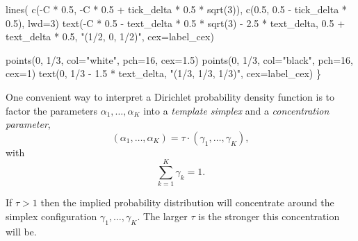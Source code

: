 \documentclass[
  letterpaper,
  DIV=11,
  numbers=noendperiod]{scrartcl}
\newenvironment{Shaded}{\begin{snugshade}}{\end{snugshade}}
\newcommand{\AttributeTok}[1]{\textcolor[rgb]{0.40,0.45,0.13}{#1}}
\newcommand{\DecValTok}[1]{\textcolor[rgb]{0.68,0.00,0.00}{#1}}
\newcommand{\FloatTok}[1]{\textcolor[rgb]{0.68,0.00,0.00}{#1}}
\newcommand{\FunctionTok}[1]{\textcolor[rgb]{0.28,0.35,0.67}{#1}}
\newcommand{\NormalTok}[1]{\textcolor[rgb]{0.00,0.23,0.31}{#1}}
\newcommand{\SpecialCharTok}[1]{\textcolor[rgb]{0.37,0.37,0.37}{#1}}
\newcommand{\StringTok}[1]{\textcolor[rgb]{0.13,0.47,0.30}{#1}}
\begin{document}
\begin{Shaded}
\begin{Highlighting}[]
  \FunctionTok{lines}\NormalTok{( }\FunctionTok{c}\NormalTok{(}\SpecialCharTok{{-}}\NormalTok{C }\SpecialCharTok{*} \FloatTok{0.5}\NormalTok{, }\SpecialCharTok{{-}}\NormalTok{C }\SpecialCharTok{*} \FloatTok{0.5} \SpecialCharTok{+}\NormalTok{ tick\_delta }\SpecialCharTok{*} \FloatTok{0.5} \SpecialCharTok{*} \FunctionTok{sqrt}\NormalTok{(}\DecValTok{3}\NormalTok{)),}
         \FunctionTok{c}\NormalTok{(}\FloatTok{0.5}\NormalTok{, }\FloatTok{0.5} \SpecialCharTok{{-}}\NormalTok{ tick\_delta }\SpecialCharTok{*} \FloatTok{0.5}\NormalTok{), }\AttributeTok{lwd=}\DecValTok{3}\NormalTok{)}
  \FunctionTok{text}\NormalTok{(}\SpecialCharTok{{-}}\NormalTok{C }\SpecialCharTok{*} \FloatTok{0.5} \SpecialCharTok{{-}}\NormalTok{ text\_delta }\SpecialCharTok{*} \FloatTok{0.5} \SpecialCharTok{*} \FunctionTok{sqrt}\NormalTok{(}\DecValTok{3}\NormalTok{) }\SpecialCharTok{{-}} \FloatTok{2.5} \SpecialCharTok{*}\NormalTok{ text\_delta,}
       \FloatTok{0.5} \SpecialCharTok{+}\NormalTok{ text\_delta }\SpecialCharTok{*} \FloatTok{0.5}\NormalTok{, }\StringTok{"(1/2, 0, 1/2)"}\NormalTok{, }\AttributeTok{cex=}\NormalTok{label\_cex)}

  \FunctionTok{points}\NormalTok{(}\DecValTok{0}\NormalTok{, }\DecValTok{1}\SpecialCharTok{/}\DecValTok{3}\NormalTok{, }\AttributeTok{col=}\StringTok{"white"}\NormalTok{, }\AttributeTok{pch=}\DecValTok{16}\NormalTok{, }\AttributeTok{cex=}\FloatTok{1.5}\NormalTok{)}
  \FunctionTok{points}\NormalTok{(}\DecValTok{0}\NormalTok{, }\DecValTok{1}\SpecialCharTok{/}\DecValTok{3}\NormalTok{, }\AttributeTok{col=}\StringTok{"black"}\NormalTok{, }\AttributeTok{pch=}\DecValTok{16}\NormalTok{, }\AttributeTok{cex=}\DecValTok{1}\NormalTok{)}
  \FunctionTok{text}\NormalTok{(}\DecValTok{0}\NormalTok{, }\DecValTok{1}\SpecialCharTok{/}\DecValTok{3} \SpecialCharTok{{-}} \FloatTok{1.5} \SpecialCharTok{*}\NormalTok{ text\_delta, }\StringTok{"(1/3, 1/3, 1/3)"}\NormalTok{, }\AttributeTok{cex=}\NormalTok{label\_cex)}
\NormalTok{\}}
\end{Highlighting}
\end{Shaded}

One convenient way to interpret a Dirichlet probability density function
is to factor the parameters \(\alpha_{1}, \ldots, \alpha_{K}\) into a
\emph{template simplex} and a \emph{concentration parameter}, \[
( \alpha_{1}, \ldots, \alpha_{K} )
=
\tau \cdot ( \gamma_{1}, \ldots, \gamma_{K} ),
\] with \[
\sum_{k = 1}^{K} \gamma_{k} = 1.
\]

If \(\tau > 1\) then the implied probability distribution will
concentrate around the simplex configuration
\(\gamma_{1}, \ldots, \gamma_{K}\). The larger \(\tau\) is the stronger
this concentration will be.
\end{document}

